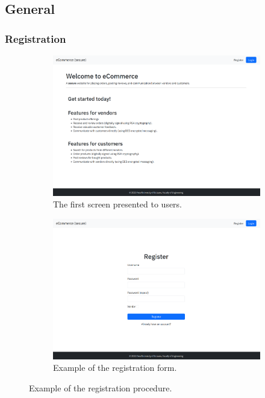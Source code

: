 \documentclass[conference,onecolumn,a4paper]{IEEEtran}
\begin{document}
\subsection{General}

\subsubsection{Registration}

\begin{figure}[H]
    \centering
    \begin{subfigure}[b]{0.4\linewidth}
        \includegraphics[width=\linewidth]{resources/welcome.png}
        \caption{The first screen presented to users.}
    \end{subfigure}
    \begin{subfigure}[b]{0.4\linewidth}
        \includegraphics[width=\linewidth]{resources/register.png}
        \caption{Example of the registration form.}
    \end{subfigure}
    \caption{Example of the registration procedure.}
\end{figure}
\end{document}
